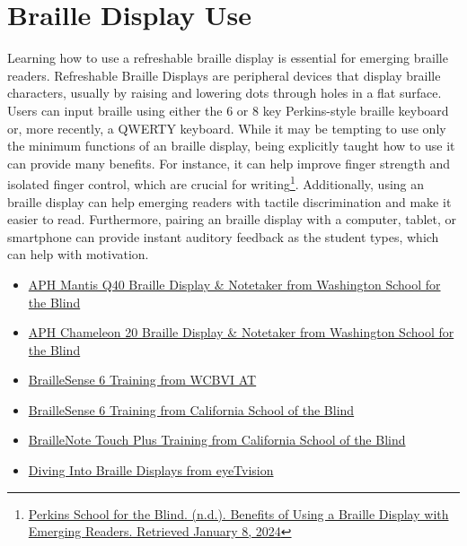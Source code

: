 \pagebreak\hypertarget{appx10}{}\section[Braille Display Use]{Braille Display Use}\label{appx10}
Learning how to use a refreshable braille display is essential for emerging braille readers. Refreshable Braille Displays are peripheral devices that display braille characters, usually by raising and lowering dots through holes in a flat surface. Users can input braille using either the 6 or 8 key Perkins-style braille keyboard or, more recently, a QWERTY keyboard. While it may be tempting to use only the minimum functions of an braille display, being explicitly taught how to use it can provide many benefits. For instance, it can help improve finger strength and isolated finger control, which are crucial for writing\footnote{\raggedright \href{https://www.perkins.org/resource/benefits-using-braille-display-emerging-readers/}{Perkins School for the Blind. (n.d.). Benefits of Using a Braille Display with Emerging Readers. Retrieved January 8, 2024}}. Additionally, using an braille display can help emerging readers with tactile discrimination and make it easier to read. Furthermore, pairing an braille display with a computer, tablet, or smartphone can provide instant auditory feedback as the student types, which can help with motivation.
\begin{itemize}[leftmargin=*]
\item \href{https://view.officeapps.live.com/op/view.aspx?src=https\%3A\%2F\%2Fwww.wssb.wa.gov\%2Fsites\%2Fdefault\%2Ffiles\%2F2021-10\%2FUsing\%2520APH\%2520Mantis\%2520Q40.docx&wdOrigin=BROWSELINK}{APH Mantis Q40 Braille Display \& Notetaker from Washington School for the Blind}
\item \href{https://view.officeapps.live.com/op/view.aspx?src=https\%3A\%2F\%2Fwww.wssb.wa.gov\%2Fsites\%2Fdefault\%2Ffiles\%2F2023-07\%2FUsing\%2520APH\%2520Chameleon\%252020.docx&wdOrigin=BROWSELINK}{APH Chameleon 20 Braille Display \& Notetaker from Washington School for the Blind}
\item \href{https://drive.google.com/drive/folders/1V\_hXjrsDeKUbNImA6Q77joADQbqMKKKl}{BrailleSense 6 Training from WCBVI AT} 
\item \href{https://drive.google.com/drive/folders/10HeixUb4E21nPLCStmnrsxLVehKThPP}{BrailleSense 6 Training from California School of the Blind} 
\item \href{https://drive.google.com/drive/folders/1OKBBdjbbD6asrE4dYyP7do9EWvY--5wf}{BrailleNote Touch Plus Training from California School of the Blind} 
\item \href{https://eyetvision.org/}{Diving Into Braille Displays from eyeTvision}
\end{itemize}

